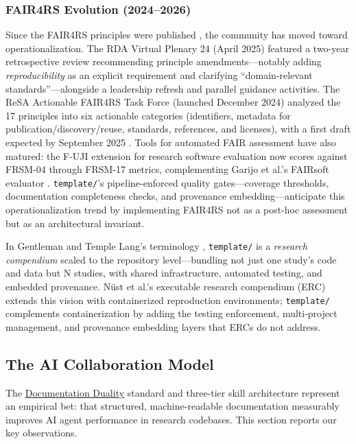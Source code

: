\documentclass[
]{article}
\begin{document}
\subsubsection{FAIR4RS Evolution
(2024--2026)}\label{fair4rs-evolution-20242026}

Since the FAIR4RS principles were published \citep{barker2022fair4rs},
the community has moved toward operationalization. The RDA Virtual
Plenary 24 (April 2025) featured a two-year retrospective review
\citep{honeyman2024fair4rs} recommending principle amendments---notably
adding \emph{reproducibility} as an explicit requirement and clarifying
``domain-relevant standards''---alongside a leadership refresh and
parallel guidance activities. The ReSA Actionable FAIR4RS Task Force
(launched December 2024) analyzed the 17 principles into six actionable
categories (identifiers, metadata for publication/discovery/reuse,
standards, references, and licenses), with a first draft expected by
September 2025 \citep{resa2024actionable}. Tools for automated FAIR
assessment have also matured: the F-UJI extension for research software
evaluation now scores against FRSM-04 through FRSM-17 metrics,
complementing Garijo et al.'s FAIRsoft evaluator
\citep{garijo2024fairsoft}. \texttt{template/}'s pipeline-enforced
quality gates---coverage thresholds, documentation completeness checks,
and provenance embedding---anticipate this operationalization trend by
implementing FAIR4RS not as a post-hoc assessment but as an
architectural invariant.

In Gentleman and Temple Lang's terminology
\citep{gentleman2007research}, \texttt{template/} is a \emph{research
compendium} scaled to the repository level---bundling not just one
study's code and data but N studies, with shared infrastructure,
automated testing, and embedded provenance. Nüst et al.'s executable
research compendium (ERC) \citep{nust2017containerization} extends this
vision with containerized reproduction environments; \texttt{template/}
complements containerization by adding the testing enforcement,
multi-project management, and provenance embedding layers that ERCs do
not address.

\newpage

\subsection{The AI Collaboration
Model}\label{the-ai-collaboration-model}

The
\href{03c_documentation.md\#documentation-duality-and-ai-collaboration}{Documentation
Duality} standard and three-tier skill architecture represent an
empirical bet: that structured, machine-readable documentation
measurably improves AI agent performance in research codebases. This
section reports our key observations.
\end{document}
